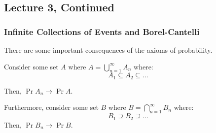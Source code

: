 \subsection{Lecture 3, Continued}

\subsubsection{Infinite Collections of Events and Borel-Cantelli}
There are some important consequences of the axioms of probability.

\begin{theorem} 
    Consider some set $A$ where $A = \bigcup_{n = 1}^{\infty} A_n$ where:
    \[ A_1 \subseteq A_2 \subseteq \dots \]

    Then, $\Pr{A_n} \rightarrow \Pr{A}$.

    Furthermore, consider some set $B$ where $B = \bigcap_{n = 1}^{\infty} B_n$ where:
    \[ B_1 \supseteq B_2 \supseteq \dots \]
    Then, $\Pr{B_n} \rightarrow \Pr{B}$.
\end{theorem}

